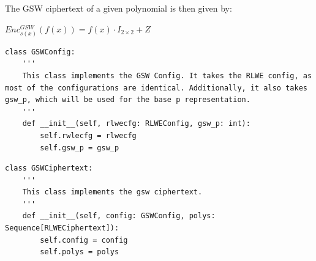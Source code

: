 \documentclass{report}
\begin{document}
	The GSW ciphertext of a given polynomial is then given by:
	\begin{center}
		$Enc_{s(x)} ^{GSW}(f(x)) = f(x) \cdot I_{2 \times 2} + Z$
	\end{center}
	
\begin{verbatim}
class GSWConfig:
	'''
	This class implements the GSW Config. It takes the RLWE config, as most of the configurations are identical. Additionally, it also takes gsw_p, which will be used for the base p representation.
	'''
	def __init__(self, rlwecfg: RLWEConfig, gsw_p: int):
		self.rwlecfg = rlwecfg
		self.gsw_p = gsw_p
\end{verbatim}
\begin{verbatim}
class GSWCiphertext:
	'''
	This class implements the gsw ciphertext.
	'''
	def __init__(self, config: GSWConfig, polys: Sequence[RLWECiphertext]):
		self.config = config
		self.polys = polys
\end{verbatim}
\end{document}

